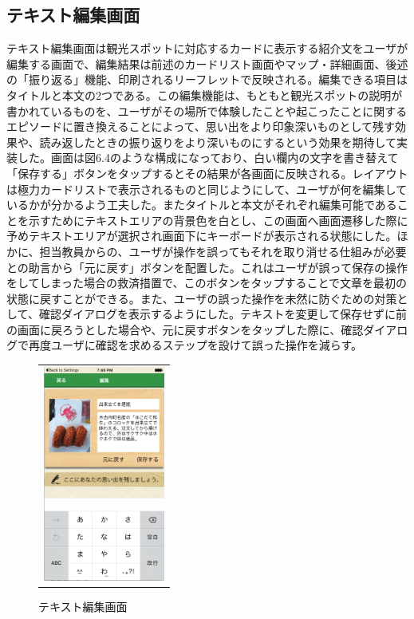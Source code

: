 \subsection{テキスト編集画面}
テキスト編集画面は観光スポットに対応するカードに表示する紹介文をユーザが編集する画面で、編集結果は前述のカードリスト画面やマップ・詳細画面、後述の「振り返る」機能、印刷されるリーフレットで反映される。編集できる項目はタイトルと本文の2つである。この編集機能は、もともと観光スポットの説明が書かれているものを、ユーザがその場所で体験したことや起こったことに関するエピソードに置き換えることによって、思い出をより印象深いものとして残す効果や、読み返したときの振り返りをより深いものにするという効果を期待して実装した。画面は図6.4のような構成になっており、白い欄内の文字を書き替えて「保存する」ボタンをタップするとその結果が各画面に反映される。レイアウトは極力カードリストで表示されるものと同じようにして、ユーザが何を編集しているかが分かるよう工夫した。またタイトルと本文がそれぞれ編集可能であることを示すためにテキストエリアの背景色を白とし、この画面へ画面遷移した際に予めテキストエリアが選択され画面下にキーボードが表示される状態にした。ほかに、担当教員からの、ユーザが操作を誤ってもそれを取り消せる仕組みが必要との助言から「元に戻す」ボタンを配置した。これはユーザが誤って保存の操作をしてしまった場合の救済措置で、このボタンをタップすることで文章を最初の状態に戻すことができる。また、ユーザの誤った操作を未然に防ぐための対策として、確認ダイアログを表示するようにした。テキストを変更して保存せずに前の画面に戻ろうとした場合や、元に戻すボタンをタップした際に、確認ダイアログで再度ユーザに確認を求めるステップを設けて誤った操作を減らす。
\newpage

\begin{figure}[htbp]
  \begin{center}
    \begin{tabular}{c}

      \begin{minipage}{0.33\hsize}
        \begin{center}
\includegraphics[width=4cm, bb=0 0 303 573]{kiko_edit.png}
        \end{center}
      \end{minipage}

    \end{tabular}
    \caption{テキスト編集画面}
    \label{fig:lena}
  \end{center}
\end{figure}

